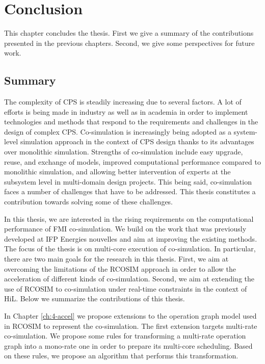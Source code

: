 \chapter{\label{ch:7-concl}Conclusion} 

\minitoc

This chapter concludes the thesis. First we give a summary of the contributions presented in the previous chapters. Second, we give some perspectives for future work.

\section{Summary}

The complexity of CPS is steadily increasing due to several factors. A lot of efforts is being made in industry as well as in academia in order to implement technologies and methods that respond to the requirements and challenges in the design of complex CPS. Co-simulation is increasingly being adopted as a system-level simulation approach in the context of CPS design thanks to its advantages over monolithic simulation. Strengths of co-simulation include easy upgrade, reuse, and exchange of models, improved computational performance compared to monolithic simulation, and allowing better intervention of experts at the subsystem level in multi-domain design projects. This being said, co-simulation faces a number of challenges that have to be addressed. This thesis constitutes a contribution towards solving some of these challenges.   

In this thesis, we are interested in the rising requirements on the computational performance of FMI co-simulation. We build on the work that was previously developed at IFP Energies nouvelles and aim at improving the existing methods. The focus of the thesis is on multi-core execution of co-simulation. In particular, there are two main goals for the research in this thesis. First, we aim at overcoming the limitations of the RCOSIM approach in order to allow the acceleration of different kinds of co-simulation. Second, we aim at extending the use of RCOSIM to co-simulation under real-time constraints in the context of HiL. Below we summarize the contributions of this thesis.

In Chapter \ref{ch:4-accel} we propose extensions to the operation graph model used in RCOSIM to represent the co-simulation. The first extension targets multi-rate co-simulation. We propose some rules for transforming a multi-rate operation graph into a mono-rate one in order to prepare its multi-core scheduling. Based on these rules, we propose an algorithm that performs this transformation.

